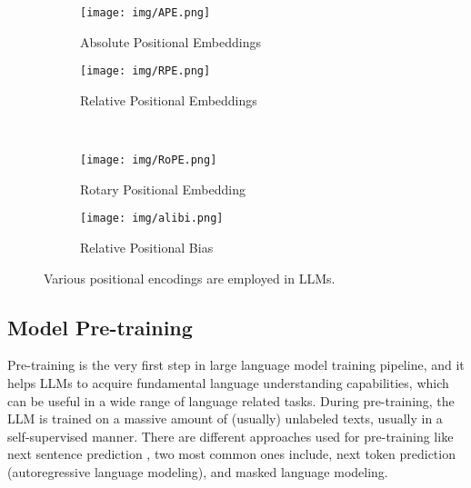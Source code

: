 \documentclass[conference]{IEEEtran}
\begin{document}
\begin{figure*}[t]
    \centering
    \begin{subfigure}[t]{0.35\textwidth}
        \texttt{[image: img/APE.png]}
        \caption{Absolute Positional Embeddings \cite{ke2020rethinking}}
        \label{fig:APE}        
    \end{subfigure}%
    \begin{subfigure}[t]{0.35\textwidth}
        \texttt{[image: img/RPE.png]}
        \caption{Relative Positional Embeddings}
        \label{fig:RPE}        
    \end{subfigure}%
        \\
    \begin{subfigure}[t]{0.35\textwidth}
        \texttt{[image: img/RoPE.png]}
        \caption{Rotary Positional Embedding \cite{rope-paper}}
        \label{fig:RoPE}        
    \end{subfigure}%
    \begin{subfigure}[t]{0.35\textwidth}
        \texttt{[image: img/alibi.png]}
        \caption{Relative Positional Bias \cite{press2021train}}
        \label{fig:RPB}        
    \end{subfigure}  
    \caption{Various positional encodings are employed in LLMs.}
    \label{fig:positional_encodings}
\end{figure*}

\iffalse
\subsection{Different Types of Attentions}

The attention mechanism has been one of the fundamental parts of transformer architecture. Although the original architecture proposed to use the self-attention mechanism for it, however, many other researchers found different ways for this specific module in the architecture. Most of the new types of attention focused on improving shortcomings of self-attention. For example, longer contexts, memory inefficiency, and computation cost issues are a few of the problems the self-attention mechanism is facing.

\textbf{Flash-attention} \cite{dao2022flashattention} \cite{dao2023flashattention2} 
\fi


\subsection{Model Pre-training}\label{sub:pre-training}
Pre-training is the very first step in large language model training pipeline, and it helps LLMs to acquire fundamental language understanding capabilities, which can be useful in a wide range of language related tasks. 
During pre-training, the LLM is trained on a massive amount of (usually) unlabeled texts, usually in a self-supervised manner.
There are different approaches used for pre-training like next sentence prediction \cite{devlin2018bert}, two most common ones include, next token prediction (autoregressive language modeling), and masked language modeling.
\end{document}
